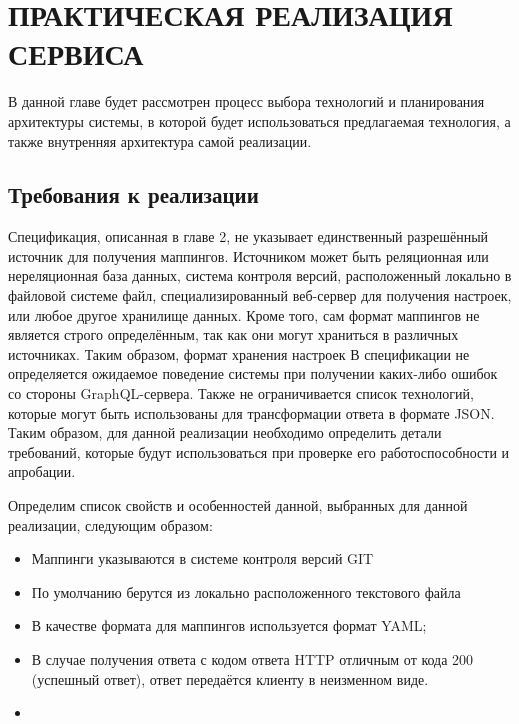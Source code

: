 \chapter{ПРАКТИЧЕСКАЯ РЕАЛИЗАЦИЯ СЕРВИСА}\label{ch:ch3-implementation}

В данной главе будет рассмотрен процесс выбора технологий и планирования архитектуры системы, в которой будет использоваться предлагаемая технология, а также внутренняя архитектура самой реализации.


\section{Требования к реализации}\label{sec:implementation-requirements}

Спецификация, описанная в главе 2, не указывает единственный разрешённый источник для получения маппингов.
Источником может быть реляционная или нереляционная база данных, система контроля версий, расположенный локально в файловой системе файл, специализированный веб-сервер для получения настроек, или любое другое хранилище данных.
Кроме того, сам формат маппингов не является строго определённым, так как они могут храниться в различных источниках.
Таким образом, формат хранения настроек
В спецификации не определяется ожидаемое поведение системы при получении каких-либо ошибок со стороны GraphQL-сервера.
Также не ограничивается список технологий, которые могут быть использованы для трансформации ответа в формате JSON\@.
Таким образом, для данной реализации необходимо определить детали требований, которые будут использоваться при проверке его работоспособности и апробации.

Определим список свойств и особенностей данной, выбранных для данной реализации, следующим образом:
\begin{itemize}
	\item Маппинги указываются в системе контроля версий GIT
	\item По умолчанию берутся из локально расположенного текстового файла
	\item В качестве формата для маппингов используется формат YAML;
	\item В случае получения ответа с кодом ответа HTTP отличным от кода 200 (успешный ответ), ответ передаётся клиенту в неизменном виде.
	\item
\end{itemize}



